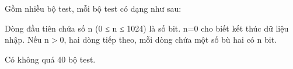 Gồm nhiều bộ test, mỗi bộ test có dạng như sau:

Dòng đầu tiên chứa số n (0 ≤ n ≤ 1024) là số bit. n=0 cho biết kết thúc dữ liệu nhập. Nếu n$>$0, hai dòng tiếp theo, mỗi dòng chứa một số bù hai có n bit.

Có không quá 40 bộ test.

\